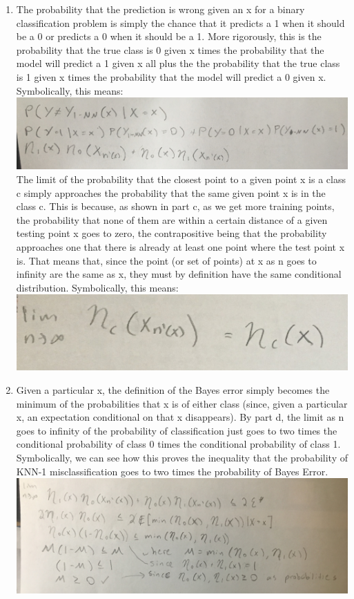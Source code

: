 \documentclass{article}
\begin{document}
\begin{enumerate}[label=\alph*.)]
	\item The probability that the prediction is wrong given an x for a binary classification problem is simply the chance that it predicts a 1 when it should be a 0 or predicts a 0 when it should be a 1. More rigorously, this is the probability that the true class is 0 given x times the probability that the model will predict a 1 given x all plus the the probability that the true class is 1 given x times the probability that the model will predict a 0 given x. Symbolically, this means:\\
	\includegraphics[scale=.075]{IMG_3679.JPG}\\
	The limit of the probability that the closest point to a given point x is a class c simply approaches the probability that the same given point x is in the class c. This is because, as shown in part c, as we get more training points, the probability that none of them are within a certain distance of a given testing point x goes to zero, the contrapositive being that the probability approaches one that there is already at least one point where the test point x is. That means that, since the point (or set of points) at x as n goes to infinity are the same as x, they must by definition have the same conditional distribution. Symbolically, this means:\\
	\includegraphics[scale=.15]{IMG_3683.JPG}
	\item Given a particular x, the definition of the Bayes error simply becomes the minimum of the probabilities that x is of either class (since, given a particular x, an expectation conditional on that x disappears). By part d, the limit as n goes to infinity of the probability of classification just goes to two times the conditional probability of class 0 times the conditional probability of class 1. Symbolically, we can see how this proves the inequality that the probability of KNN-1 misclassification goes to two times the probability of Bayes Error. \\
	\includegraphics[scale=.1]{IMG_3688.jpg}
\end{enumerate}
\end{document}
